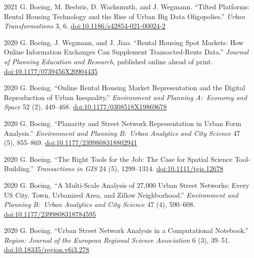 \documentclass[11pt,letterpaper]{report}
\begin{document}
\begin{tablist}
        \item[2021] \tab{}G. Boeing, M. Besbris, D. Wachsmuth, and J. Wegmann. \enquote{Tilted Platforms: Rental Housing Technology and the Rise of Urban Big Data Oligopolies.} \textit{Urban Transformations} 3, 6. \href{https://doi.org/10.1186/s42854-021-00024-2}{doi:10.1186/s42854-021-00024-2}

        \item[2020] \tab{}G. Boeing, J. Wegmann, and J. Jiao. \enquote{Rental Housing Spot Markets: How Online Information Exchanges Can Supplement Transacted-Rents Data.} \textit{Journal of Planning Education and Research}, published online ahead of print. \href{https://doi.org/10.1177/0739456X20904435}{doi:10.1177/0739456X20904435}

        \item[2020] \tab{}G. Boeing. \enquote{Online Rental Housing Market Representation and the Digital Reproduction of Urban Inequality.} \textit{Environment and Planning A:\ Economy and Space} 52 (2), 449--468. \href{https://doi.org/10.1177/0308518X19869678}{doi:10.1177/0308518X19869678}

        \item[2020] \tab{}G. Boeing. \enquote{Planarity and Street Network Representation in Urban Form Analysis.} \textit{Environment and Planning B:\ Urban Analytics and City Science} 47 (5), 855--869. \href{https://doi.org/10.1177/2399808318802941}{doi:10.1177/2399808318802941}

        \item[2020] \tab{}G. Boeing. \enquote{The Right Tools for the Job: The Case for Spatial Science Tool-Building.} \textit{Transactions in GIS} 24 (5), 1299--1314. \href{https://doi.org/10.1111/tgis.12678}{doi:10.1111/tgis.12678}

        \item[2020] \tab{}G. Boeing. \enquote{A Multi-Scale Analysis of 27,000 Urban Street Networks: Every US City, Town, Urbanized Area, and Zillow Neighborhood.} \textit{Environment and Planning B:\ Urban Analytics and City Science} 47 (4), 590--608. \href{https://doi.org/10.1177/2399808318784595}{doi:10.1177/2399808318784595}

        \item[2020] \tab{}G. Boeing. \enquote{Urban Street Network Analysis in a Computational Notebook.} \textit{Region: Journal of the European Regional Science Association} 6 (3), 39--51. \href{https://doi.org/10.18335/region.v6i3.278}{doi:10.18335/region.v6i3.278}


\end{tablist}
\end{document}
